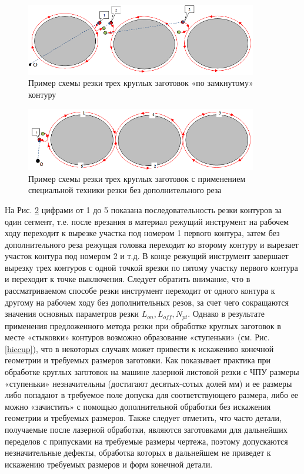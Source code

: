 \documentclass[12pt,twoside]{report}
\begin{document}
\begin{figure}
  \begin{center}
  \includegraphics[width=0.9\textwidth]{3-3.png}
  \caption{Пример схемы резки трех круглых заготовок «по замкнутому» контуру}
  \label{3-3}
  \end{center}
\end{figure}

\begin{figure}
  \begin{center}
  \includegraphics[width=0.9\textwidth]{3-1.png}
  \caption{Пример схемы резки трех круглых заготовок с применением специальной техники резки без дополнительного реза}
  \label{3-1}
  \end{center}
\end{figure}

На Рис. \ref{3-1}
цифрами от 1 до 5 показана последовательность
резки контуров за один сегмент,
т.е. после врезания в материал режущий инструмент
на рабочем ходу переходит к вырезке участка
под номером 1 первого контура,
затем без дополнительного реза режущая головка
переходит ко второму контуру и вырезает участок
контура под номером 2 и т.д.
В конце режущий инструмент завершает
вырезку трех контуров с одной точкой
врезки по пятому участку первого контура и
переходит к точке выключения.
Следует обратить внимание, что в рассматриваемом
способе резки инструмент переходит от одного контура к
другому на рабочем ходу без дополнительных резов,
за счет чего сокращаются значения основных параметров резки
$L_{on}, L_{off}, N_{pt}$.
Однако в результате применения предложенного метода
резки при обработке круглых заготовок в месте «стыковки»
контуров возможно образование «ступеньки»
(см. Рис. \ref{hiccup}),
что в некоторых случаях может привести к
искажению конечной геометрии и требуемых размеров заготовки.
Как показывает практика при обработке круглых заготовок на
машине лазерной листовой резки с ЧПУ размеры «ступеньки» незначительны
(достигают десятых-сотых долей мм)
и ее размеры либо попадают в требуемое поле допуска
для соответствующего размера, либо ее можно «зачистить»
с помощью дополнительной обработки без искажения геометрии и требуемых размеров.
Также следует отметить, что часто детали,
получаемые после лазерной обработки,
являются заготовками для дальнейших переделов с
припусками на требуемые размеры чертежа,
поэтому допускаются незначительные дефекты,
обработка которых в дальнейшем не приведет к
искажению требуемых размеров и форм конечной детали.
\end{document}
